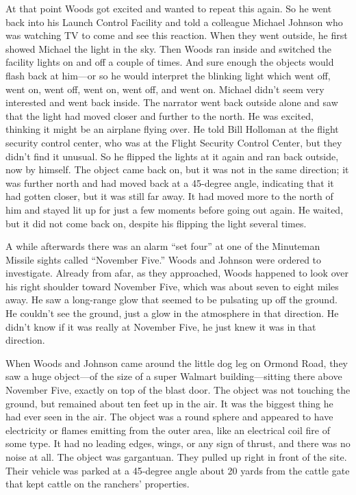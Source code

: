At that point Woods got excited and wanted to repeat this again.
So he went back into his Launch Control Facility and told a colleague Michael Johnson who was watching TV to come and see this reaction.
When they went outside, he first showed Michael the light in the sky.
Then Woods ran inside and switched the facility lights on and off a couple of times.
And sure enough the objects would flash back at him---or so he would interpret the blinking light which went off, went on, went off, went on, went off, and went on.
Michael didn't seem very interested and went back inside. The narrator went back outside alone and saw that the light had moved closer and further to the north.
He was excited, thinking it might be an airplane flying over. He told Bill Holloman at the flight security control center,
who was at the Flight Security Control Center, but they didn't find it unusual.
So he flipped the lights at it again and ran back outside, now by himself.
The object came back on, but it was not in the same direction; it was further north and had moved back at a 45-degree angle, indicating that it had gotten closer, but it was still far away. It had moved more to the north of him and stayed lit up for just a few moments before going out again.
He waited, but it did not come back on, despite his flipping the light several times.

A while afterwards there was an alarm ``set four'' at one of the Minuteman Missile sights called ``November Five.''
Woods and Johnson were ordered to investigate.
Already from afar, as they approached,
Woods happened to look over his right shoulder toward November Five, which was about seven to eight miles away.
He saw a long-range glow that seemed to be pulsating up off the ground. He couldn't see the ground, just a glow in the atmosphere in that direction.
He didn't know if it was really at November Five, he just knew it was in that direction.

When Woods and Johnson came around the little dog leg on Ormond Road,
they saw a huge object---of the size of a super Walmart building---sitting there above November Five, exactly on top of the blast door.
The object was not touching the ground, but remained about ten feet up in the air.
It was the biggest thing he had ever seen in the air.
The object was a round sphere and appeared to have electricity or flames emitting from the outer area,
like an electrical coil fire of some type.
It had no leading edges, wings, or any sign of thrust, and there was no noise at all.
The object was gargantuan. They pulled up right in front of the site.
Their vehicle was parked at a 45-degree angle about 20 yards from the cattle gate that kept cattle on the ranchers' properties.

